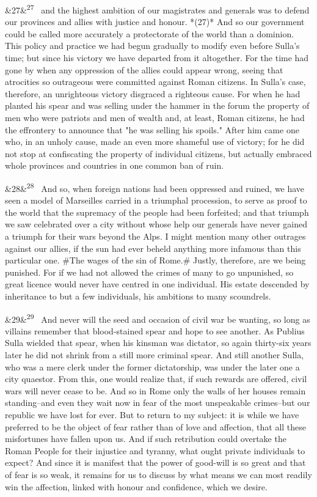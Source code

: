 \documentclass[12pt]{article}
\newcommand{\para}[1][]{\par\noindent\ifx&#1&\else\textsuperscript{\footnotesize #1}~\fi}
\begin{document}
\para[27] and the highest ambition of our magistrates and generals was to defend our provinces and allies with justice and honour. *(27)* And so our government could be called more accurately a protectorate of the world than a dominion. This policy and practice we had begun gradually to modify even before Sulla's time; but since his victory we have departed from it altogether. For the time had gone by when any oppression of the allies could appear wrong, seeing that atrocities so outrageous were committed against Roman citizens. In Sulla's case, therefore, an unrighteous victory disgraced a righteous cause. For when he had planted his spear and was selling under the hammer in the forum the property of men who were patriots and men of wealth and, at least, Roman citizens, he had the effrontery to announce that "he was selling his spoils." After him came one who, in an unholy cause, made an even more shameful use of victory; for he did not stop at confiscating the property of individual citizens, but actually embraced whole provinces and countries in one common ban of ruin.

\para[28] And so, when foreign nations had been oppressed and ruined, we have seen a model of Marseilles carried in a triumphal procession, to serve as proof to the world that the supremacy of the people had been forfeited; and that triumph we saw celebrated over a city without whose help our generals have never gained a triumph for their wars beyond the Alps. I might mention many other outrages against our allies, if the sun had ever beheld anything more infamous than this particular one. \#The wages of the sin of Rome.\# Justly, therefore, are we being punished. For if we had not allowed the crimes of many to go unpunished, so great licence would never have centred in one individual. His estate descended by inheritance to but a few individuals, his ambitions to many scoundrels.

\para[29] And never will the seed and occasion of civil war be wanting, so long as villains remember that blood-stained spear and hope to see another. As Publius Sulla wielded that spear, when his kinsman was dictator, so again thirty-six years later he did not shrink from a still more criminal spear. And still another Sulla, who was a mere clerk under the former dictatorship, was under the later one a city quaestor. From this, one would realize that, if such rewards are offered, civil wars will never cease to be. And so in Rome only the walls of her houses remain standing--and even they wait now in fear of the most unspeakable crimes--but our republic we have lost for ever. But to return to my subject: it is while we have preferred to be the object of fear rather than of love and affection, that all these misfortunes have fallen upon us. And if such retribution could overtake the Roman People for their injustice and tyranny, what ought private individuals to expect? And since it is manifest that the power of good-will is so great and that of fear is so weak, it remains for us to discuss by what means we can most readily win the affection, linked with honour and confidence, which we desire.
\end{document}
